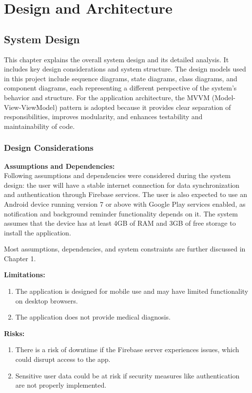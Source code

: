 \chapter{Design and Architecture}
\label{ch:design}

\section{System Design}

This chapter explains the overall system design and its detailed analysis. It includes key design considerations and system structure. The design models used in this project include sequence diagrams, state diagrams, class diagrams, and component diagrams, each representing a different perspective of the system's behavior and structure. For the application architecture, the MVVM (Model-View-ViewModel) pattern is adopted because it provides clear separation of responsibilities, improves modularity, and enhances testability and maintainability of code.

\subsection{Design Considerations}

\textbf{Assumptions and Dependencies:}\\
Following assumptions and dependencies were considered during the system design: the user will have a stable internet connection for data synchronization and authentication through Firebase services. The user is also expected to use an Android device running version 7 or above with Google Play services enabled, as notification and background reminder functionality depends on it. The system assumes that the device has at least 4GB of RAM and 3GB of free storage to install the application.

Most assumptions, dependencies, and system constraints are further discussed in Chapter 1.

\textbf{Limitations:}
\begin{enumerate}
    \item The application is designed for mobile use and may have limited functionality on desktop browsers.
    \item The application does not provide medical diagnosis.
\end{enumerate}

\textbf{Risks:}
\begin{enumerate}
    \item There is a risk of downtime if the Firebase server experiences issues, which could disrupt access to the app.
    \item Sensitive user data could be at risk if security measures like authentication are not properly implemented.
\end{enumerate}

